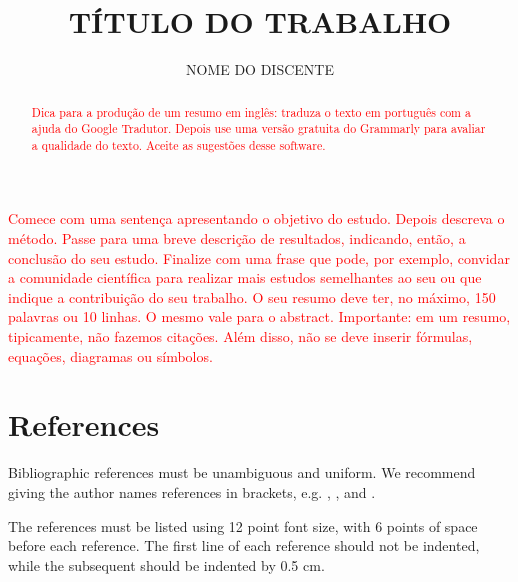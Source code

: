 \documentclass[12pt]{article}
\title{TÍTULO DO TRABALHO}
\author{NOME DO DISCENTE} %
\begin{document}
 







\renewcommand{\contentsname}{\centering \bfseries SUMÁRIO}
\tableofcontents
\thispagestyle{empty}

\clearpage
{}


\maketitle


\begin{resumo} 
  \textcolor{red}{Comece com uma sentença apresentando o objetivo do estudo. Depois descreva o método. Passe para uma breve descrição de resultados, indicando, então, a conclusão do seu estudo. Finalize com uma frase que pode, por exemplo, convidar a comunidade científica para realizar mais estudos semelhantes ao seu ou que indique a contribuição do seu trabalho. O seu resumo deve ter, no máximo, 150 palavras ou 10 linhas. O mesmo vale para o abstract. Importante: em um resumo, tipicamente, não fazemos citações. Além disso, não se deve inserir fórmulas, equações, diagramas ou símbolos.}
\end{resumo}

\begin{abstract}
  \textcolor{red}{Dica para a produção de um resumo em inglês: traduza o texto em português com a ajuda do Google Tradutor. Depois use uma versão gratuita do Grammarly para avaliar a qualidade do texto. Aceite as sugestões desse software.}
\end{abstract}




%

\section{References}

Bibliographic references must be unambiguous and uniform.  We recommend giving the author names references in brackets, e.g. \cite{knuth:84},
\cite{boulic:91}, and \cite{smith:99}.

The references must be listed using 12 point font size, with 6 points of space before each reference. The first line of each reference should not be indented, while the subsequent should be indented by 0.5 cm.










\end{document}
